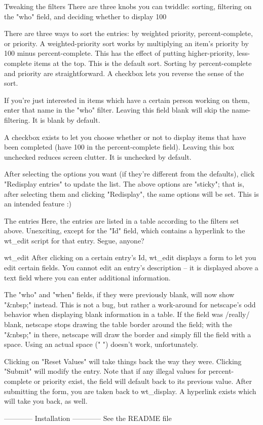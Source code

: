 	Tweaking the filters
		There are three knobs you can twiddle: sorting, filtering on the
		"who" field, and deciding whether to display 100%

		There are three ways to sort the entries: by weighted priority,
		percent-complete, or priority.  A weighted-priority sort works by
		multiplying an item's priority by 100 minus percent-complete.
		This has the effect of putting higher-priority, less-complete items
		at the top. This is the default sort.  Sorting by percent-complete
		and priority are straightforward.  A checkbox lets you reverse the
		sense of the sort.

		If you're just interested in items which have a certain person
		working on them, enter that name in the "who" filter. Leaving this
		field blank will skip the name-filtering. It is blank by default.

		A checkbox exists to let you choose whether or not to display
		items that have been completed (have 100 in the percent-complete
		field). Leaving this box unchecked reduces screen clutter. It is
		unchecked by default.

		After selecting the options you want (if they're different from
		the defaults), click "Redisplay entries" to update the list.
		The above options are "sticky"; that is, after selecting them and
		clicking "Redisplay", the same options will be set. This is an
		intended feature :)

	The entries
		Here, the entries are listed in a table according to the filters
		set above.  Unexciting, except for the "Id" field, which contains
		a hyperlink to the wt_edit script for that entry. Segue, anyone?

wt_edit
	After clicking on a certain entry's Id, wt_edit displays a form to let you
	edit certain fields. You cannot edit an entry's description -- it is
	displayed above a text field where you can enter additional information.

	The "who" and "when" fields, if they were previously blank, will now show
	"&nbsp;" instead.  This is not a bug, but rather a work-around for
	netscape's odd behavior when displaying blank information in a table.
	If the field was /really/ blank, netscape stops drawing the table border
	around the field; with the "&nbsp;" in there, netscape will draw the
	border and simply fill the field with a space. Using an actual space (" ")
	doesn't work, unfortunately.

	Clicking on "Reset Values" will take things back the way they were.
	Clicking "Submit" will modify the entry.  Note that if any illegal values
	for percent-complete or priority exist, the field will default back to its
	previous value. After submitting the form, you are taken back to wt_display.
	A hyperlink exists which will take you back, as well.

------------
Installation
------------
See the README file
